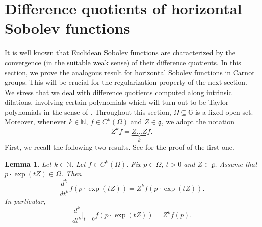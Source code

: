 \documentclass[11pt]{amsart}
\theoremstyle{plain}
\newtheorem{lemma}[theorem]{Lemma}
\theoremstyle{definition}
\theoremstyle{remark}
\numberwithin{equation}{section}
\begin{document}
\section{Difference quotients of horizontal Sobolev functions} \label{sec_difference_quotients}
It is well known that Euclidean Sobolev functions are characterized by the convergence (in the suitable weak sense) of their difference quotients. In this section, we prove the analogous result for horizontal Sobolev functions in Carnot groups. This will be crucial for the regularization property of the next section. We stress that we deal with difference quotients computed along intrinsic dilations, involving certain polynomials which will turn out to be Taylor polynomials in the sense of \cite{MR0657581,BonLanUgu}. Throughout this section, $\Omega \subseteq \mathbb{G}$ is a fixed open set. Moreover, whenever $k \in \mathbb{N}$, $f \in C^k(\Omega)$ and $Z \in \mathfrak{g}$, we adopt the notation
\begin{equation*}
Z^k f = \underbrace{Z \dots Z}_{k} f.
\end{equation*}
First, we recall the following two results. See \cite[Lemma 2.12.1]{MR746308} for the proof of the first one.
\begin{lemma}
Let $k \in \mathbb{N}$. Let $f \in C^k(\Omega)$. Fix $p \in \Omega$, $t>0$ and $Z \in \mathfrak{g}$. Assume that $p \cdot \exp(tZ) \in \Omega$. Then
\begin{equation} \label{eq_iterated_derivative}
\frac{d^k}{dt^k} f(p \cdot \exp(tZ)) = Z^k f (p \cdot \exp(tZ)).
\end{equation}
In particular,
\begin{equation} \label{eq_iterated_derivative_zero}
\frac{d^k}{dt^k}\bigg\rvert_{t=0} f(p \cdot \exp(tZ)) = Z^k f(p).
\end{equation}
\end{lemma}
\end{document}
